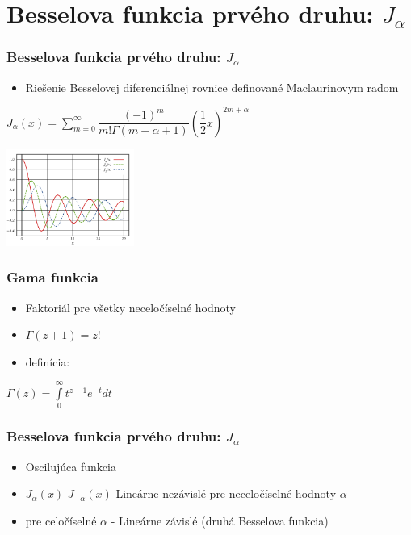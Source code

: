\documentclass{beamer}
\begin{document}
\section{Besselova funkcia prvého druhu: $J_{\alpha}$}
\begin{frame}
\frametitle{Besselova funkcia prvého druhu: $J_{\alpha}$}
\begin{itemize} 
\item Riešenie Besselovej diferenciálnej rovnice definované Maclaurinovym radom
\end{itemize}
\begin{center}
$J_{\alpha}(x) = \displaystyle\sum\limits_{m=0}^{\infty}\dfrac{(-1)^m}{m!\Gamma(m+\alpha+1)}(\dfrac{1}{2}x)^{2m+\alpha} $

\includegraphics[height=120px]{bessel1.png} 
\end{center}
\end{frame}

\begin{frame}
\frametitle{Gama funkcia}

\begin{itemize}
\item Faktoriál pre všetky neceločíselné hodnoty
\item $\Gamma(z+1)=z!$
\item definícia:
\end{itemize}
\begin{center}
$ \Gamma(z) = \displaystyle\int\limits_{0}^{\infty}t^{z-1}e^{-t} dt$
\end{center}
\end{frame}

\begin{frame}
\frametitle{Besselova funkcia prvého druhu: $J_{\alpha}$}
\begin{itemize}
\item Oscilujúca funkcia
\item $J_{\alpha}(x)$ $J_{-\alpha}(x)$ Lineárne nezávislé pre neceločíselné hodnoty $\alpha$
\item  pre celočíselné $\alpha$ - Lineárne závislé (druhá Besselova funkcia)
\end{itemize}

\end{frame}
\end{document}
